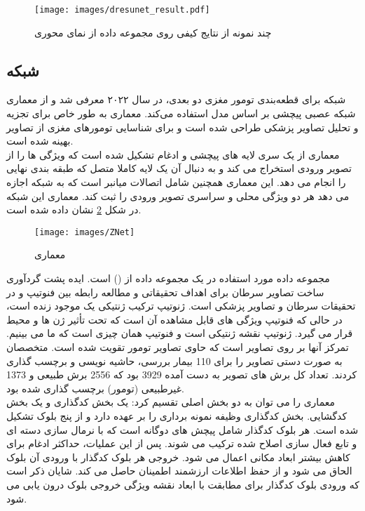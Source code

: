 \begin{figure}[ht]
\centerline{\texttt{[image: images/dresunet\_result.pdf]}}
\caption[\hspace{0.5em}معماری ]{چند نمونه از نتایج کیفی  روی مجموعه داده  از نمای محوری\cite{raza2023dresu}}
\label{fig:dresunet_result}
\end{figure}


\subsection{ شبکه }
شبکه \cite{ottom2022znet} برای قطعه‌بندی تومور مغزی  دو بعدی، در سال ۲۰۲۲ معرفی شد و از معماری شبکه عصبی پیچشی بر اساس مدل  استفاده می‌کند. معماری  به طور خاص برای تجزیه و تحلیل تصاویر پزشکی طراحی شده است و برای شناسایی تومورهای مغزی از تصاویر بهینه شده است.
\\
معماری  از یک سری لایه های پیچشی و ادغام تشکیل شده است که ویژگی ها را از تصویر ورودی استخراج می کند و به دنبال آن یک لایه کاملا متصل که طبقه بندی نهایی را انجام می دهد. این معماری همچنین شامل اتصالات میانبر است که به شبکه اجازه می دهد هر دو ویژگی محلی و سراسری تصویر ورودی را ثبت کند. معماری این شبکه در شکل \ref{fig:ZNet} نشان داده شده است.
\\
\begin{figure}[ht]
\centerline{\texttt{[image: images/ZNet]}}
\caption[\hspace{0.5em}معماری ]{معماری \cite{ottom2022znet}}
\label{fig:ZNet}
\end{figure}
مجموعه داده مورد استفاده در \cite{ottom2022znet} یک مجموعه داده از  () است. ایده پشت گردآوری  ساخت تصاویر سرطان برای اهداف تحقیقاتی و مطالعه رابطه بین فنوتیپ و  در تحقیقات سرطان و تصاویر پزشکی است. ژنوتیپ ترکیب ژنتیکی یک موجود زنده است، در حالی که فنوتیپ ویژگی های قابل مشاهده آن است که تحت تأثیر ژن ها و محیط قرار می گیرد. ژنوتیپ نقشه ژنتیکی است و فنوتیپ همان چیزی است که ما می بینیم. تمرکز آنها بر روی تصاویر   است که حاوی تصاویر تومور تقویت شده  است. متخصصان به صورت دستی تصاویر  را برای 110 بیمار بررسی، حاشیه نویسی و برچسب گذاری کردند. تعداد کل برش های تصویر به دست آمده 3929 بود که 2556 برش طبیعی و 1373 غیرطبیعی (تومور) برچسب گذاری شده بود.
\\
معماری  را می توان به دو بخش اصلی تقسیم کرد: یک بخش کدگذاری و یک بخش کدگشایی. بخش کدگذاری وظیفه نمونه برداری را بر عهده دارد و از پنج بلوک تشکیل شده است. هر بلوک کدگذار شامل پیچش های دوگانه است که با نرمال سازی دسته ای و تابع فعال سازی اصلاح شده  ترکیب می شوند. پس از این عملیات، حداکثر ادغام برای کاهش بیشتر ابعاد مکانی اعمال می شود. خروجی هر بلوک کدگذار با ورودی آن بلوک الحاق می شود و از حفظ اطلاعات ارزشمند اطمینان حاصل می کند. شایان ذکر است که ورودی بلوک کدگذار برای مطابقت با ابعاد نقشه ویژگی خروجی بلوک درون یابی می شود.

